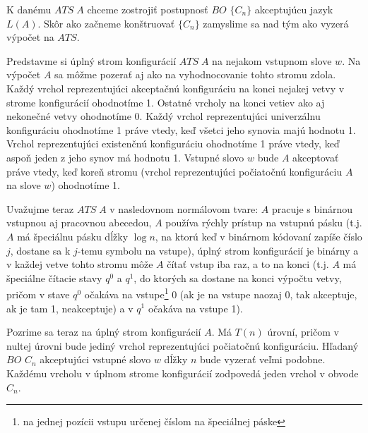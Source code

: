 {\begin{dokaz}
K danému $ATS\;A$ chceme zostrojiť postupnosť $BO$ $\{ C_n\}$
akceptujúcu jazyk $L(A)$. Skôr ako začneme konštruovať $\{ C_n\}$
zamyslime sa nad tým ako vyzerá výpočet na $ATS$.

Predstavme si úplný strom konfigurácií $ATS\;A$ na nejakom
vstupnom slove $w$. Na výpočet $A$ sa môžme pozerať aj ako na
vyhodnocovanie tohto stromu zdola. Každý vrchol reprezentujúci
akceptačnú konfiguráciu na konci nejakej vetvy v strome
konfigurácií ohodnotíme 1. Ostatné vrcholy na konci vetiev ako aj
nekonečné vetvy ohodnotíme 0. Každý vrchol reprezentujúci
univerzálnu konfiguráciu ohodnotíme 1 práve vtedy, keď všetci jeho
synovia majú hodnotu 1. Vrchol reprezentujúci existenčnú
konfiguráciu ohodnotíme 1 práve vtedy, keď aspoň jeden z jeho
synov má hodnotu 1. Vstupné slovo $w$ bude $A$ akceptovať práve
vtedy, keď koreň stromu (vrchol reprezentujúci počiatočnú
konfiguráciu $A$ na slove $w$) ohodnotíme 1.

Uvažujme teraz $ATS\;A$ v nasledovnom normálovom tvare:\newline
$A$ pracuje s binárnou vstupnou aj pracovnou abecedou, $A$ používa
rýchly prístup na vstupnú pásku (t.j. $A$ má špeciálnu pásku dĺžky
$\log n$, na ktorú keď v binárnom kódovaní zapíše číslo $j$,
dostane sa k $j$-temu symbolu na vstupe), úplný strom konfigurácií
je binárny a v každej vetve tohto stromu môže $A$ čítať vstup iba
raz, a to na konci (t.j. $A$ má špeciálne čítacie stavy $q^0$ a
$q^1$, do ktorých sa dostane na konci výpočtu vetvy, pričom v
stave $q^0$ očakáva na vstupe\footnote{na jednej pozícii vstupu
určenej číslom na špeciálnej páske} 0 (ak je na vstupe naozaj 0,
tak akceptuje, ak je tam 1, neakceptuje) a v $q^1$ očakáva na
vstupe 1).

Pozrime sa teraz na úplný strom konfigurácií $A$. Má $T(n)$
úrovní, pričom v nultej úrovni bude jediný vrchol reprezentujúci
počiatočnú konfiguráciu. Hľadaný $BO$ $C_n$ akceptujúci vstupné
slovo $w$ dĺžky $n$ bude vyzerať veľmi podobne. Každému vrcholu v
úplnom strome konfigurácií zodpovedá jeden vrchol v obvode $C_n$.


\end{dokaz}}
